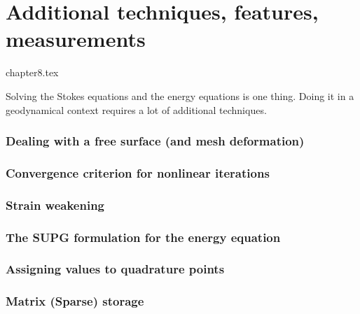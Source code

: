 \chapter{Additional techniques, features, measurements} %

\begin{flushright} {\tiny {\color{gray} chapter8.tex}} \end{flushright}

Solving the Stokes equations and the energy equations is one thing. Doing it in 
a geodynamical context requires a lot of additional techniques. 
\newpage %
\subsection{Dealing with a free surface (and mesh deformation)}\label{sec:freesurface}  
\newpage %
\subsection{Convergence criterion for nonlinear iterations\label{sec:nlconvcrit}} 
\newpage %
\subsection{Strain weakening} \label{sec:strainweakening}  %
\newpage %
\subsection{The SUPG formulation for the energy equation} \label{ss:supg}  %
\newpage %
\subsection{Assigning values to quadrature points \label{ss:averagings}}  %
\newpage %
\subsection{Matrix (Sparse) storage}  %
\newpage %
